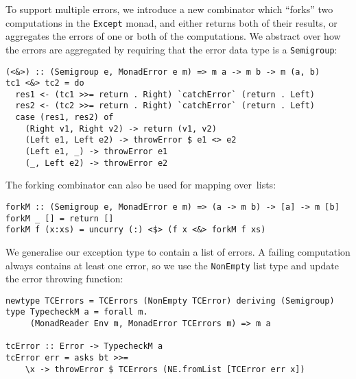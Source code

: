\documentclass[sigplan,screen]{acmart}
\makeatletter
\newcommand{\ec}[1]{\lstinline[style=encore,breaklines=true,basicstyle=\fontsize{9}{9}\tt]@#1@}
\makeatother
\begin{document}
To support multiple errors, we introduce a
new combinator which ``forks'' two computations in the \ec{Except}
monad, and either returns both of their results, or aggregates the
errors of one or both of the computations. We abstract
over how the errors are aggregated by requiring that the error
data type is a \ec{Semigroup}:%

\begin{minipage}[t]{\linewidth}
\begin{lstlisting}[style=encore]
(<&>) :: (Semigroup e, MonadError e m) => m a -> m b -> m (a, b)
tc1 <&> tc2 = do
  res1 <- (tc1 >>= return . Right) `catchError` (return . Left)
  res2 <- (tc2 >>= return . Right) `catchError` (return . Left)
  case (res1, res2) of
    (Right v1, Right v2) -> return (v1, v2)
    (Left e1, Left e2) -> throwError $ e1 <> e2
    (Left e1, _) -> throwError e1
    (_, Left e2) -> throwError e2
\end{lstlisting}
\end{minipage}

The forking combinator can also be used for mapping over~lists:

\begin{minipage}[t]{\linewidth}
\begin{lstlisting}[style=encore]
forkM :: (Semigroup e, MonadError e m) => (a -> m b) -> [a] -> m [b]
forkM _ [] = return []
forkM f (x:xs) = uncurry (:) <$> (f x <&> forkM f xs)
\end{lstlisting}
\end{minipage}

We generalise our exception type to contain a list of errors. A
failing computation always contains at least one error, so we use
the \ec{NonEmpty} list type and update the error throwing function:

\begin{minipage}[t]{\linewidth}
\begin{lstlisting}[style=encore]
newtype TCErrors = TCErrors (NonEmpty TCError) deriving (Semigroup)
type TypecheckM a = forall m.
     (MonadReader Env m, MonadError TCErrors m) => m a

tcError :: Error -> TypecheckM a
tcError err = asks bt >>=
    \x -> throwError $ TCErrors (NE.fromList [TCError err x])
\end{lstlisting}
\end{minipage}
\end{document}
